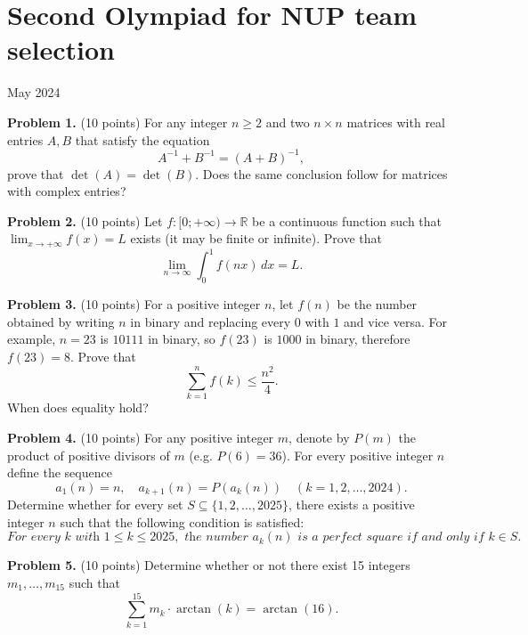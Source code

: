 \documentclass{article}
\begin{document}
\pagestyle{plain}

\section*{Second Olympiad for NUP team selection}

\begin{center}
May 2024
\end{center}

\textbf{Problem 1.} (10 points)
For any integer $n \geq 2$ and two $n \times n$ matrices with real entries $A, B$ that satisfy the equation
\[
A^{-1} + B^{-1} = (A + B)^{-1},
\]
prove that $\det(A) = \det(B)$. Does the same conclusion follow for matrices with complex entries?

\textbf{Problem 2.} (10 points)
Let \( f : [0; +\infty) \to \mathbb{R} \) be a continuous function such that \( \lim_{x \to +\infty} f(x) = L \) exists (it may be finite or infinite). Prove that
\[
\lim_{n \to \infty} \int_0^1 f(nx) \, dx = L.
\]

\textbf{Problem 3.} (10 points)
For a positive integer \( n \),
let \( f(n) \) be the number obtained by writing \( n \) in binary and replacing every \( 0 \) with \( 1 \) and vice versa. For example, \( n = 23 \) is \( 10111 \) in binary, so \( f(23) \) is \( 1000 \) in binary, therefore \( f(23) = 8 \). Prove that
\[
\sum_{k=1}^n f(k) \leq \frac{n^2}{4}.
\]
When does equality hold?

\textbf{Problem 4.} (10 points)
For any positive integer \(m\), denote by \(P(m)\) the product of positive divisors
of \(m\) (e.g. \(P(6) = 36\)).
For every positive integer \(n\) define the sequence
\[
a_1(n) = n, \quad a_{k+1}(n) = P(a_k(n)) \quad (k = 1, 2, \ldots, 2024).
\]
Determine whether for every set \(S \subseteq \{1, 2, \ldots, 2025\}\),
there exists a positive integer \(n\) such that the following condition is satisfied:
\[
\textit{For every } k \textit{ with } 1 \leq k \leq 2025,
\textit{ the number } a_k(n)
\textit{ is a perfect square if and only if } k \in S.
\]

\textbf{Problem 5.} (10 points)
Determine whether or not there exist 15 integers
\( m_1, \dots, m_{15} \) such that
\[
\sum_{k=1}^{15} m_k \cdot \arctan(k) = \arctan(16).
\]
\end{document}
